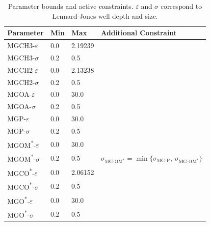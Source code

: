 \documentclass[12pt,openany,final]{book}
\newcommand{\beginsupplemental}{%
    \setcounter{table}{0}
    \renewcommand{\thetable}{S\arabic{table}}%
    \setcounter{figure}{0}
    \renewcommand{\thefigure}{S\arabic{figure}}%
}
\begin{document}
\beginsupplemental
\begin{table}[h!]
    \tiny
\begin{tabularx}{\textwidth}{X|X|X|X}
\hline
\textbf{Parameter} & \textbf{Min} & \textbf{Max} & \textbf{Additional Constraint} \\
\hline
MGCH3-$\varepsilon$                   & 0.0 & 2.19239 & \\\hline
MGCH3-$\sigma$                        & 0.2 & 0.5     & \\\hline
MGCH2-$\varepsilon$                   & 0.0 & 2.13238 & \\\hline
MGCH2-$\sigma$                        & 0.2 & 0.5     & \\\hline
MGOA-$\varepsilon$                    & 0.0 & 30.0    & \\\hline
MGOA-$\sigma$                         & 0.2 & 0.5     & \\\hline
MGP-$\varepsilon$                     & 0.0 & 30.0    & \\\hline
MGP-$\sigma$                          & 0.2 & 0.5     & \\\hline
MGOM\textsuperscript{*}-$\varepsilon$ & 0.0 & 30.0    & \\\hline
MGOM\textsuperscript{*}-$\sigma$      & 0.2 & 0.5     & $\sigma_{\text{MG-OM}^*} = \min\big\{\sigma_{\text{MG-P}},\ \sigma_{\text{MG-OM}^*}\big\} $\\\hline
MGCO\textsuperscript{*}-$\varepsilon$ & 0.0 & 2.06152 & \\\hline
MGCO\textsuperscript{*}-$\sigma$      & 0.2 & 0.5     & \\\hline
MGO\textsuperscript{*}-$\varepsilon$  & 0.0 & 30.0    & \\\hline
MGO\textsuperscript{*}-$\sigma$       & 0.2 & 0.5     & \\\hline
\hline
\end{tabularx}
\caption[Parameter bounds and active constraints]{Parameter bounds and active constraints. $\varepsilon$ and $\sigma$ correspond to Lennard-Jones well depth and size.}
\label{tab:constrain}
\end{table}
\end{document}

